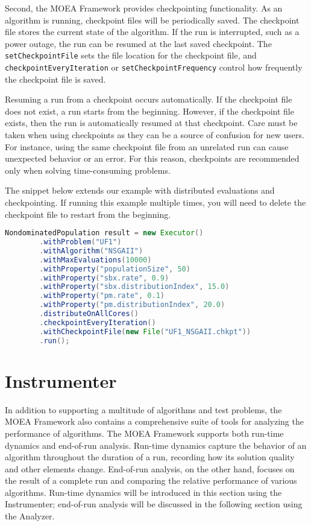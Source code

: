 Second, the MOEA Framework provides checkpointing functionality.  As an algorithm is running, checkpoint files will be periodically saved.  The checkpoint file stores the current state of the algorithm.  If the run is interrupted, such as a power outage, the run can be resumed at the last saved checkpoint.  The \texttt{setCheckpointFile} sets the file location for the checkpoint file, and \texttt{checkpointEveryIteration} or \texttt{setCheckpointFrequency} control how frequently the checkpoint file is saved.

Resuming a run from a checkpoint occurs automatically.  If the checkpoint file does not exist, a run starts from the beginning.  However, if the checkpoint file exists, then the run is automatically resumed at that checkpoint.  Care must be taken when using checkpoints as they can be a source of confusion for new users.  For instance, using the same checkpoint file from an unrelated run can cause unexpected behavior or an error.  For this reason, checkpoints are recommended only when solving time-consuming problems.

The snippet below extends our example with distributed evaluations and checkpointing.  If running this example multiple times, you will need to delete the checkpoint file to restart from the beginning.

\begin{lstlisting}[language=Java]
NondominatedPopulation result = new Executor()
		.withProblem("UF1")
		.withAlgorithm("NSGAII")
		.withMaxEvaluations(10000)
		.withProperty("populationSize", 50)
		.withProperty("sbx.rate", 0.9)
		.withProperty("sbx.distributionIndex", 15.0)
		.withProperty("pm.rate", 0.1)
		.withProperty("pm.distributionIndex", 20.0)
		.distributeOnAllCores()
		.checkpointEveryIteration()
		.withCheckpointFile(new File("UF1_NSGAII.chkpt"))
		.run();
\end{lstlisting}

\section{Instrumenter}
In addition to supporting a multitude of algorithms and test problems, the MOEA Framework also contains a comprehensive suite of tools for analyzing the performance of algorithms.  The MOEA Framework supports both run-time dynamics and end-of-run analysis.  Run-time dynamics capture the behavior of an algorithm throughout the duration of a run, recording how its solution quality and other elements change.  End-of-run analysis, on the other hand, focuses on the result of a complete run and comparing the relative performance of various algorithms.  Run-time dynamics will be introduced in this section using the Instrumenter; end-of-run analysis will be discussed in the following section using the Analyzer.

